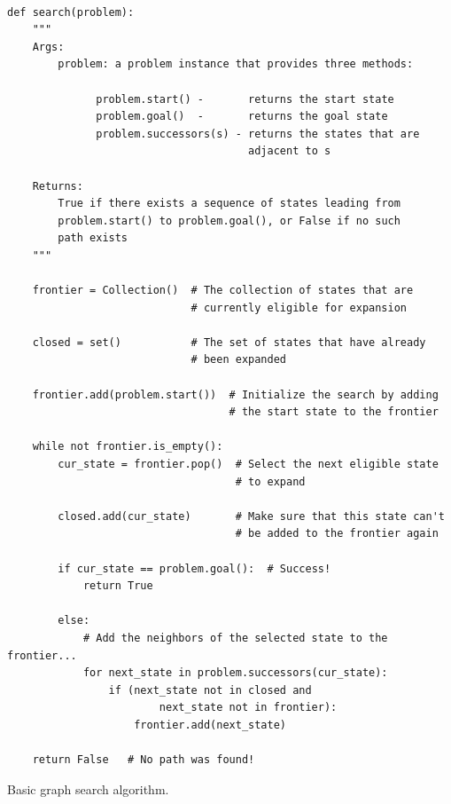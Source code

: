 \begin{listing}[H]
\begin{verbatim}

def search(problem):
    """
    Args:
        problem: a problem instance that provides three methods:

              problem.start() -       returns the start state
              problem.goal()  -       returns the goal state
              problem.successors(s) - returns the states that are 
                                      adjacent to s

    Returns:                              
        True if there exists a sequence of states leading from
        problem.start() to problem.goal(), or False if no such
        path exists
    """
    
    frontier = Collection()  # The collection of states that are
                             # currently eligible for expansion         
             
    closed = set()           # The set of states that have already
                             # been expanded

    frontier.add(problem.start())  # Initialize the search by adding
                                   # the start state to the frontier

    while not frontier.is_empty():
        cur_state = frontier.pop()  # Select the next eligible state
                                    # to expand

        closed.add(cur_state)       # Make sure that this state can't 
                                    # be added to the frontier again

        if cur_state == problem.goal():  # Success!
            return True
        
        else:
            # Add the neighbors of the selected state to the frontier...
            for next_state in problem.successors(cur_state):
                if (next_state not in closed and
                        next_state not in frontier):
                    frontier.add(next_state)
                        
    return False   # No path was found!

\end{verbatim}
\caption{Basic graph search algorithm.}
\label{lst:graph_search}
\end{listing}

